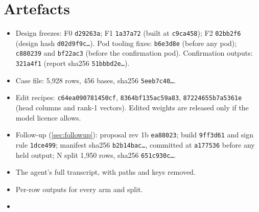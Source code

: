 \section{Artefacts}
\label{app:artefacts}

\begin{itemize}
  \item Design freezes: F0 \texttt{d29263a}; F1 \texttt{1a37a72} (built at \texttt{c9ca458}); F2 \texttt{02bb2f6} (design hash \texttt{d02d9f9c\ldots}).
        Pod tooling fixes: \texttt{b6e3d8e} (before any pod); \texttt{c880239} and \texttt{bf22ac3} (before the
        confirmation pod). Confirmation outputs: \texttt{321a4f1} (report sha256 \texttt{51bbbd2e\ldots}).
  \item Case file: 5,928 rows, 456 bases, sha256 \texttt{5eeb7c40\ldots}.
  \item Edit recipes: \texttt{c64ea090781450cf}, \texttt{8364bf135ac59a83}, \texttt{87224655b7a5361e}
        (head columns and rank-1 vectors). Edited weights are released only if the model licence allows.
  \item Follow-up (\cref{sec:followup}): proposal rev 1b \texttt{ea88023}; build \texttt{9ff3d61} and sign rule
        \texttt{1dce499}; manifest sha256 \texttt{b2b14bac\ldots}, committed at \texttt{a177536} before any held
        output; N split 1,950 rows, sha256 \texttt{651c930c\ldots}. 
  \item The agent's full transcript, with paths and keys removed.
  \item Per-row outputs for every arm and split.
  \item {}
\end{itemize}

